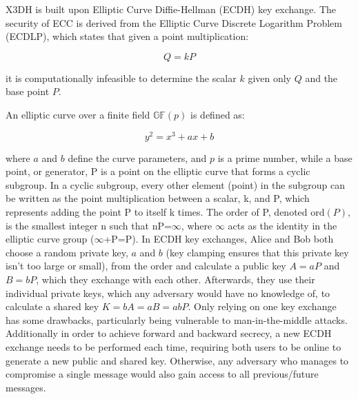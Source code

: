 X3DH is built upon Elliptic Curve Diffie-Hellman (ECDH) key exchange. The security of ECC is derived from the Elliptic Curve Discrete Logarithm Problem (ECDLP), which states that given a point multiplication:

$$
Q = kP
$$

it is computationally infeasible to determine the scalar \( k \) given only \( Q \) and the base point \( P \).

An elliptic curve over a finite field \( \mathbb{GF}(p) \) is defined as:

$$
y^2 = x^3 + ax + b
$$

where \( a \) and \( b \) define the curve parameters, and \( p \) is a prime number, while a base point, or generator, P is a point on the elliptic curve that forms a cyclic subgroup. In a cyclic subgroup, every other element (point) in the subgroup can be written as the point multiplication between a scalar, k, and P, which represents                                                                                                                                             adding the point P to itself k times. The order of P, denoted \( \text{ord}(P) \), is the smallest integer n such that nP=\( \infty \), where \( \infty \) acts as the identity in the elliptic curve group (\( \infty \)+P=P).
In ECDH key exchanges, Alice and Bob both choose a random private key, \( a \) and \( b \) (key clamping ensures that this private key isn't too large or small), from the order and calculate a public key \( A = aP \) and \( B = bP \), which they exchange with each other. Afterwards, they use their individual private keys, which any adversary would have no knowledge of, to calculate a shared key \( K = bA = aB = abP \). Only relying on one key exchange has some drawbacks, particularly being vulnerable to man-in-the-middle attacks. Additionally in order to achieve forward and backward secrecy, a new ECDH exchange needs to be performed each time, requiring both users to be online to generate a new public and shared key. Otherwise, any adversary who manages to compromise a single message would also gain access to all previous/future messages.